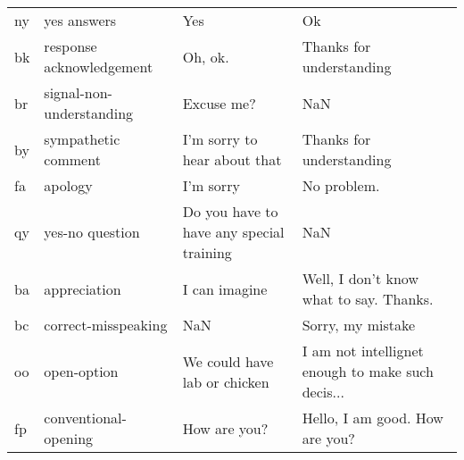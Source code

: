 \begin{tabular}{llll}
ny          &                   yes answers &                                              Yes &                                                 Ok \\
bk          &      response acknowledgement &                                          Oh, ok. &                           Thanks for understanding \\
br          &      signal-non-understanding &                                       Excuse me? &                                                NaN \\
by          &           sympathetic comment &                     I'm sorry to hear about that &                           Thanks for understanding \\
fa          &                       apology &                                        I'm sorry &                                        No problem. \\
qy          &               yes-no question &         Do you have to have any special training &                                                NaN \\
ba          &                  appreciation &                                    I can imagine &            Well, I don't know what to say. Thanks. \\
bc          &           correct-misspeaking &                                              NaN &                                  Sorry, my mistake \\
oo          &                   open-option &                     We could have lab or chicken &  I am not intellignet enough to make such decis... \\
fp          &          conventional-opening &                                     How are you? &                     Hello, I am good. How are you? \\
\bottomrule
\end{tabular}
